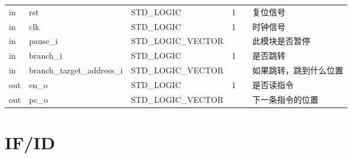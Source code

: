 \documentclass{article}
\begin{document}
\begin{center}




    \tablelasttail{\bottomrule}

    \small
    \begin{supertabular}{lllllp{2cm}}

    in & rst\label{PC:rst} & STD_LOGIC & 1 &  & 复位信号 \\
    in & clk\label{PC:clk} & STD_LOGIC & 1 &  & 时钟信号 \\
    in & pause_i\label{PC:pause_i} & STD_LOGIC_VECTOR &  &  & 此模块是否暂停 \\
    in & branch_i\label{PC:branch_i} & STD_LOGIC & 1 &  & 是否跳转 \\
    in & branch_target_address_i\label{PC:branch_target_address_i} & STD_LOGIC_VECTOR  &   &  & 如果跳转，跳到什么位置    \\
    out & en_o\label{PC:en_o} & STD_LOGIC & 1 &  & 是否读指令 \\
    out & pc_o\label{PC:pc_o} & STD_LOGIC_VECTOR &   &  & 下一条指令的位置 \\

    \end{supertabular}
\end{center}
\FloatBarrier

\section{IF/ID\label{sec:IF/ID}}
\end{document}
